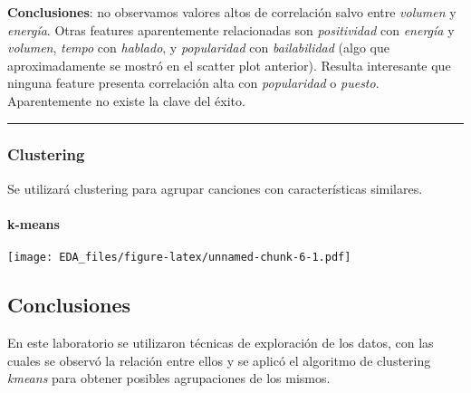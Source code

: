 \documentclass[]{article}
\newenvironment{Shaded}{\begin{snugshade}}{\end{snugshade}}
\newcommand{\KeywordTok}[1]{\textcolor[rgb]{0.13,0.29,0.53}{\textbf{#1}}}
\newcommand{\DataTypeTok}[1]{\textcolor[rgb]{0.13,0.29,0.53}{#1}}
\newcommand{\DecValTok}[1]{\textcolor[rgb]{0.00,0.00,0.81}{#1}}
\newcommand{\FloatTok}[1]{\textcolor[rgb]{0.00,0.00,0.81}{#1}}
\newcommand{\StringTok}[1]{\textcolor[rgb]{0.31,0.60,0.02}{#1}}
\newcommand{\CommentTok}[1]{\textcolor[rgb]{0.56,0.35,0.01}{\textit{#1}}}
\newcommand{\OtherTok}[1]{\textcolor[rgb]{0.56,0.35,0.01}{#1}}
\newcommand{\OperatorTok}[1]{\textcolor[rgb]{0.81,0.36,0.00}{\textbf{#1}}}
\newcommand{\NormalTok}[1]{#1}
\let\oldparagraph\paragraph
\renewcommand{\paragraph}[1]{\oldparagraph{#1}\mbox{}}
\begin{document}
\textbf{Conclusiones}: no observamos valores altos de correlación salvo
entre \emph{volumen} y \emph{energía}. Otras features aparentemente
relacionadas son \emph{positividad} con \emph{energía} y \emph{volumen},
\emph{tempo} con \emph{hablado}, y \emph{popularidad} con
\emph{bailabilidad} (algo que aproximadamente se mostró en el scatter
plot anterior). Resulta interesante que ninguna feature presenta
correlación alta con \emph{popularidad} o \emph{puesto}. Aparentemente
no existe la clave del éxito.

\begin{center}\rule{0.5\linewidth}{\linethickness}\end{center}

\subsubsection{Clustering}\label{clustering}

Se utilizará clustering para agrupar canciones con características
similares.

\paragraph{k-means}\label{k-means}

\begin{Shaded}
\end{Shaded}

\texttt{[image: EDA\_files/figure-latex/unnamed-chunk-6-1.pdf]}

\subsection{Conclusiones}\label{conclusiones}

En este laboratorio se utilizaron técnicas de exploración de los datos,
con las cuales se observó la relación entre ellos y se aplicó el
algoritmo de clustering \emph{kmeans} para obtener posibles agrupaciones
de los mismos.
\end{document}
